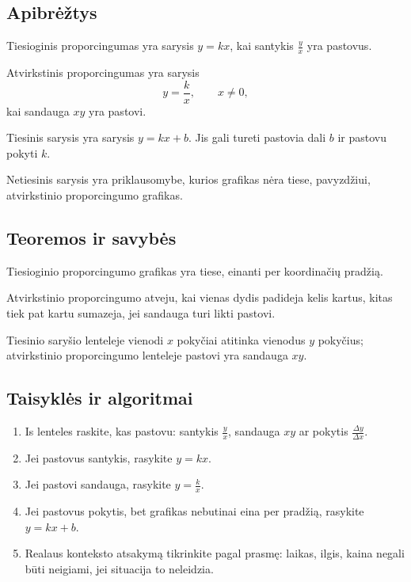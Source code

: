 \subsection{Apibrėžtys}
\begin{apibreztis}
Tiesioginis proporcingumas yra sarysis $y=kx$, kai santykis $\frac{y}{x}$ yra pastovus.
\end{apibreztis}
\begin{apibreztis}
Atvirkstinis proporcingumas yra sarysis
\[
y=\frac{k}{x},\qquad x\ne0,
\]
kai sandauga $xy$ yra pastovi.
\end{apibreztis}
\begin{apibreztis}
Tiesinis sarysis yra sarysis $y=kx+b$. Jis gali tureti pastovia dali $b$ ir pastovu pokyti $k$.
\end{apibreztis}
\begin{apibreztis}
Netiesinis sarysis yra priklausomybe, kurios grafikas nėra tiese, pavyzdžiui, atvirkstinio proporcingumo grafikas.
\end{apibreztis}

\subsection{Teoremos ir savybės}
\begin{savybe}
Tiesioginio proporcingumo grafikas yra tiese, einanti per koordinačių pradžią.
\end{savybe}
\begin{savybe}
Atvirkstinio proporcingumo atveju, kai vienas dydis padideja kelis kartus, kitas tiek pat kartu sumazeja, jei sandauga turi likti pastovi.
\end{savybe}
\begin{savybe}
Tiesinio saryšio lenteleje vienodi $x$ pokyčiai atitinka vienodus $y$ pokyčius; atvirkstinio proporcingumo lenteleje pastovi yra sandauga $xy$.
\end{savybe}

\subsection{Taisyklės ir algoritmai}
\begin{enumerate}[label=\arabic*.]
\item Is lenteles raskite, kas pastovu: santykis $\frac{y}{x}$, sandauga $xy$ ar pokytis $\frac{\Delta y}{\Delta x}$.
\item Jei pastovus santykis, rasykite $y=kx$.
\item Jei pastovi sandauga, rasykite $y=\frac{k}{x}$.
\item Jei pastovus pokytis, bet grafikas nebutinai eina per pradžią, rasykite $y=kx+b$.
\item Realaus konteksto atsakymą tikrinkite pagal prasmę: laikas, ilgis, kaina negali būti neigiami, jei situacija to neleidzia.
\end{enumerate}
